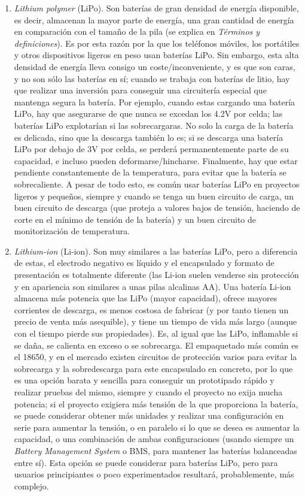 \documentclass[12pt]{article}
\begin{document}
	\begin{enumerate}
		
		\item \textit{Lithium polymer} (LiPo).  Son baterías de gran densidad de energía disponible, es decir, almacenan la mayor parte de energía, una gran cantidad de energía en comparación con el tamaño de la pila (se explica en \textit{Términos y definiciones}). Es por esta razón por la que los teléfonos móviles, los portátiles y otros dispositivos ligeros en peso usan baterías LiPo. Sin embargo, esta alta densidad de energía lleva consigo un coste/inconveniente, y es que son caras, y no son sólo las baterías en sí; cuando se trabaja con baterías de litio, hay que realizar una inversión para conseguir una circuitería especial que mantenga segura la batería. Por ejemplo, cuando estas cargando una batería LiPo, hay que asegurarse de que nunca se excedan los 4.2V por celda; las baterías LiPo explotarían si las sobrecargaras. No solo la carga de la batería es delicada, sino que la descarga también lo es; si se descarga una batería LiPo por debajo de 3V por celda, se perderá permanentemente parte de su capacidad, e incluso pueden deformarse/hincharse. Finalmente, hay que estar pendiente constantemente de la temperatura, para evitar que la batería se sobrecaliente. A pesar de todo esto, es común usar baterías LiPo en proyectos ligeros y pequeños, siempre y cuando se tenga un buen circuito de carga, un buen circuito de descarga (que proteja a valores bajos de tensión, haciendo de corte en el mínimo de tensión de la batería) y un buen circuito de monitorización de temperatura. 
		
		\item \textit{Lithium-ion} (Li-ion). Son muy similares a las baterías LiPo, pero a diferencia de estas, el electrodo negativo es líquido y el encapsulado y formato de presentación es totalmente diferente (las Li-ion suelen venderse sin protección y en apariencia son similares a unas pilas alcalinas AA). Una batería Li-ion almacena más potencia que las LiPo (mayor capacidad), ofrece mayores corrientes de descarga, es menos costosa de fabricar (y por tanto tienen un precio de venta más asequible),  y tiene un tiempo de vida más largo (aunque con el tiempo pierde sus propiedades). Es, al igual que las LiPo, inflamable si se daña, se calienta en exceso o se sobrecarga. El empaquetado más común es el 18650, y en el mercado existen circuitos de protección varios para evitar la sobrecarga y la sobredescarga  para este encapsulado en concreto, por lo que es una opción barata y sencilla para conseguir un prototipado rápido y realizar pruebas del mismo, siempre y cuando el proyecto no exija mucha potencia; si el proyecto exigiera más tensión de la que proporciona la batería, se puede considerar obtener más unidades y realizar una configuración en serie para aumentar la tensión, o en paralelo si lo que se desea es aumentar la capacidad, o una combinación de ambas configuraciones (usando siempre un \textit{Battery Management System} o BMS, para mantener las baterías balanceadas entre sí). Esta opción se puede considerar para baterías LiPo, pero para usuarios principiantes o poco experimentados resultará, probablemente, más complejo.
		

\end{enumerate}
\end{document}
